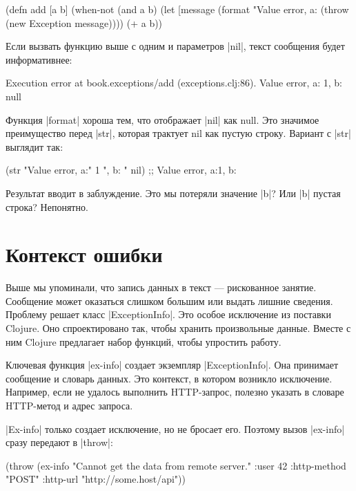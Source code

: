 \begin{code}
(defn add [a b]
  (when-not (and a b)
    (let [message (format "Value error, a: %
      (throw (new Exception message))))
  (+ a b))
\end{code}

Если вызвать функцию выше с одним и параметров \spverb|nil|, текст сообщения будет
информативнее:

\begin{code}
Execution error at book.exceptions/add (exceptions.clj:86).
Value error, a: 1, b: null
\end{code}

Функция \spverb|format| хороша тем, что отображает \spverb|nil| как null. Это значимое
преимущество перед \spverb|str|, которая трактует nil как пустую строку. Вариант с
\spverb|str| выглядит так:

\begin{code}
(str "Value error, a:" 1 ", b: " nil)
;; Value error, a:1, b:
\end{code}

Результат вводит в заблуждение. Это мы потеряли значение \spverb|b|? Или \spverb|b| пустая
строка? Непонятно.

\section{Контекст ошибки}

Выше мы упоминали, что запись данных в текст — рискованное занятие. Сообщение
может оказаться слишком большим или выдать лишние сведения. Проблему решает
класс \spverb|ExceptionInfo|. Это особое исключение из поставки Clojure. Оно
спроектировано так, чтобы хранить произвольные данные. Вместе с ним Clojure
предлагает набор функций, чтобы упростить работу.

Ключевая функция \spverb|ex-info| создает экземпляр \spverb|ExceptionInfo|. Она принимает
сообщение и словарь данных. Это контекст, в котором возникло
исключение. Например, если не удалось выполнить HTTP-запрос, полезно указать в
словаре HTTP-метод и адрес запроса.

\spverb|Ex-info| только создает исключение, но не бросает его. Поэтому вызов \spverb|ex-info|
сразу передают в \spverb|throw|:

\begin{code}
(throw (ex-info
        "Cannot get the data from remote server."
        {:user 42
         :http-method "POST"
         :http-url "http://some.host/api"}))
\end{code}

